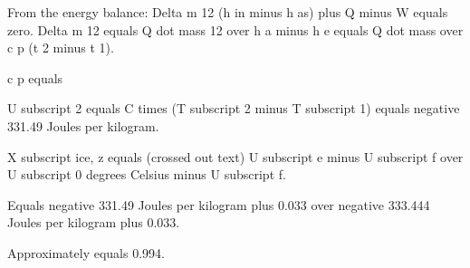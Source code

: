 From the energy balance:  
Delta m 12 (h in minus h as) plus Q minus W equals zero.  
Delta m 12 equals Q dot mass 12 over h a minus h e equals Q dot mass over c p (t 2 minus t 1).  

c p equals

U subscript 2 equals C times (T subscript 2 minus T subscript 1) equals negative 331.49 Joules per kilogram.

X subscript ice, z equals (crossed out text) U subscript e minus U subscript f over U subscript 0 degrees Celsius minus U subscript f.

Equals negative 331.49 Joules per kilogram plus 0.033 over negative 333.444 Joules per kilogram plus 0.033.

Approximately equals 0.994.